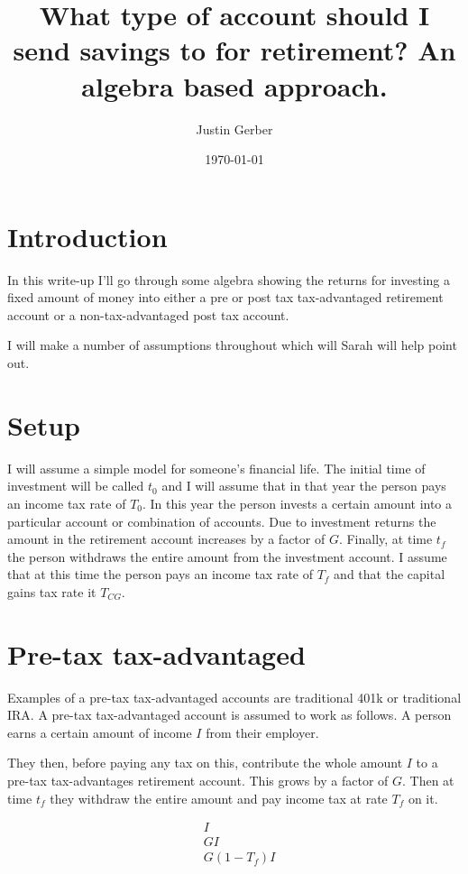 \documentclass[12pt]{article}
\begin{document}
\title{What type of account should I send savings to for retirement? An algebra based approach.}
\author{Justin Gerber}
\date{\today}
\maketitle

\section{Introduction}

In this write-up I'll go through some algebra showing the returns for investing a fixed amount of money into either a pre or post tax tax-advantaged retirement account or a non-tax-advantaged post tax account.

I will make a number of assumptions throughout which will Sarah will help point out.

\section{Setup}

I will assume a simple model for someone's financial life. 
The initial time of investment will be called $t_0$ and I will assume that in that year the person pays an income tax rate of $T_0$. 
In this year the person invests a certain amount into a particular account or combination of accounts.
Due to investment returns the amount in the retirement account increases by a factor of $G$.
Finally, at time $t_f$ the person withdraws the entire amount from the investment account.
I assume that at this time the person pays an income tax rate of $T_f$ and that the capital gains tax rate it $T_{CG}$.

\section{Pre-tax tax-advantaged}

Examples of a pre-tax tax-advantaged accounts are traditional 401k or traditional IRA.
A pre-tax tax-advantaged account is assumed to work as follows. A person earns a certain amount of income $I$ from their employer. 

They then, before paying any tax on this, contribute the whole amount $I$ to a pre-tax tax-advantages retirement account.
This grows by a factor of $G$.
Then at time $t_f$ they withdraw the entire amount and pay income tax at rate $T_f$ on it.

\begin{align}
&I\\
&GI\\
&G(1-T_f)I
\end{align}
\end{document}
